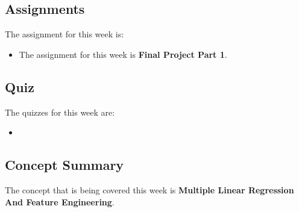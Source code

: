 \subsection{Assignments}

The assignment for this week is:

\begin{itemize}
    \item The assignment for this week is \textbf{Final Project Part 1}. 
\end{itemize}

\subsection{Quiz}

The quizzes for this week are:

\begin{itemize}
    \item {} \textbullet {} 
\end{itemize}

\subsection{Concept Summary}

The concept that is being covered this week is \textbf{Multiple Linear Regression And Feature Engineering}.

